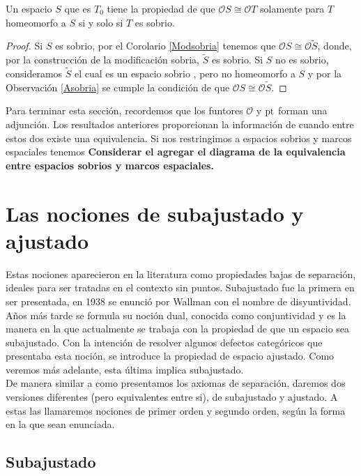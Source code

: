 \documentclass{comunicaciones}
\begin{document}
\begin{prop}
    Un espacio $S$ que es $T_0$ tiene la propiedad de que $\mathcal{O}S\cong \mathcal{O}T$ solamente para $T$ homeomorfo a $S$ si y solo si $T$ es sobrio.
\end{prop}

\begin{proof}
    Si $S$ es sobrio, por el Corolario \ref{Modsobria} tenemos que $\mathcal{O}S\cong \mathcal{O}\tilde{S}$, donde, por la construcción de la modificación sobria, $\tilde{S}$ es sobrio. Si $S$ no es sobrio, consideramos $\tilde{S}$ el cual es un espacio sobrio , pero no homeomorfo a $S$ y por la Observación \ref{Asobria} se cumple la condición de que $\mathcal{O}S\cong \mathcal{O}\tilde{S}$.
\end{proof}

Para terminar esta sección, recordemos que los funtores $\mathcal{O}$ y $\mathrm{pt}$ forman una adjunción. Los resultados anteriores proporcionan la información de cuando entre estos dos existe una equivalencia. Si nos restringimos a espacios sobrios y marcos espaciales tenemos 
\textbf{Considerar el agregar el diagrama de la equivalencia entre espacios sobrios y marcos espaciales.}

\section{Las nociones de subajustado y ajustado}

Estas nociones aparecieron en la literatura como propiedades bajas de separación, ideales para ser tratadas en el contexto sin puntos. Subajustado fue la primera en ser presentada, en 1938 se enunció por Wallman con el nombre de disyuntividad. Años más tarde se formula su noción dual, conocida como conjuntividad y es la manera en la que actualmente se trabaja con la propiedad de que un espacio sea subajustado. Con la intención de resolver algunos defectos categóricos que presentaba esta noción, se introduce la propiedad de espacio ajustado. Como veremos más adelante, esta última implica subajustado.\\

De manera similar a como presentamos los axiomas de separación, daremos dos versiones diferentes (pero equivalentes entre si), de subajustado y ajustado. A estas las llamaremos nociones de primer orden y segundo orden, según la forma en la que sean enunciada. 

\subsection{Subajustado}
\end{document}
